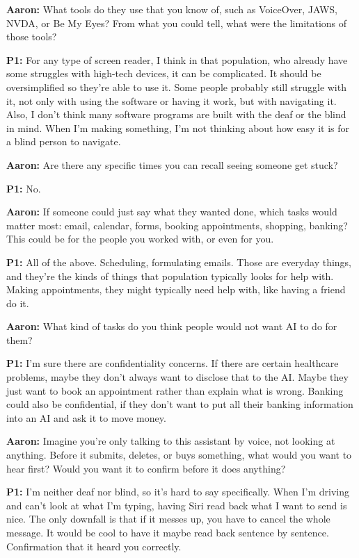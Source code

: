 \textbf{Aaron:} What tools do they use that you know of, such as VoiceOver, JAWS, NVDA, or Be My Eyes? From what you could tell, what were the limitations of those tools?

\textbf{P1:} For any type of screen reader, I think in that population, who already have some struggles with high-tech devices, it can be complicated. It should be oversimplified so they're able to use it. Some people probably still struggle with it, not only with using the software or having it work, but with navigating it. Also, I don't think many software programs are built with the deaf or the blind in mind. When I'm making something, I'm not thinking about how easy it is for a blind person to navigate.

\textbf{Aaron:} Are there any specific times you can recall seeing someone get stuck?

\textbf{P1:} No.

\textbf{Aaron:} If someone could just say what they wanted done, which tasks would matter most: email, calendar, forms, booking appointments, shopping, banking? This could be for the people you worked with, or even for you.

\textbf{P1:} All of the above. Scheduling, formulating emails. Those are everyday things, and they're the kinds of things that population typically looks for help with. Making appointments, they might typically need help with, like having a friend do it.

\textbf{Aaron:} What kind of tasks do you think people would not want AI to do for them?

\textbf{P1:} I'm sure there are confidentiality concerns. If there are certain healthcare problems, maybe they don't always want to disclose that to the AI. Maybe they just want to book an appointment rather than explain what is wrong. Banking could also be confidential, if they don't want to put all their banking information into an AI and ask it to move money.

\textbf{Aaron:} Imagine you're only talking to this assistant by voice, not looking at anything. Before it submits, deletes, or buys something, what would you want to hear first? Would you want it to confirm before it does anything?

\textbf{P1:} I'm neither deaf nor blind, so it's hard to say specifically. When I'm driving and can't look at what I'm typing, having Siri read back what I want to send is nice. The only downfall is that if it messes up, you have to cancel the whole message. It would be cool to have it maybe read back sentence by sentence. Confirmation that it heard you correctly.

